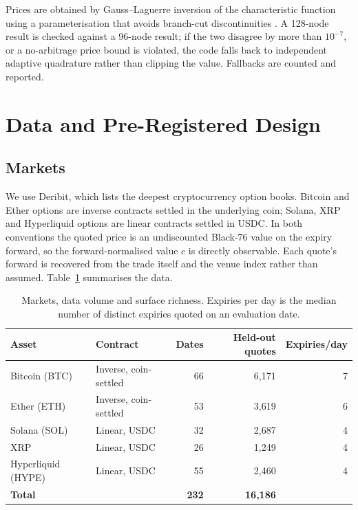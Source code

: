 \documentclass[runningheads]{llncs}
\begin{document}
Prices are obtained by Gauss--Laguerre inversion of the characteristic function
using a parameterisation that avoids branch-cut discontinuities
\cite{lord2010}. A 128-node result is checked against a 96-node result; if the
two disagree by more than $10^{-7}$, or a no-arbitrage price bound is violated,
the code falls back to independent adaptive quadrature rather than clipping the
value. Fallbacks are counted and reported.

\section{Data and Pre-Registered Design}

\subsection{Markets}

We use Deribit, which lists the deepest cryptocurrency option books. Bitcoin
and Ether options are inverse contracts settled in the underlying coin; Solana,
XRP and Hyperliquid options are linear contracts settled in USDC. In both
conventions the quoted price is an undiscounted Black-76 value on the expiry
forward, so the forward-normalised value $c$ is directly observable. Each
quote's forward is recovered from the trade itself and the venue index rather
than assumed. Table~\ref{tab:markets} summarises the data.

\begin{table}[htbp]
\centering
\caption{Markets, data volume and surface richness. Expiries per day is the
median number of distinct expiries quoted on an evaluation date.}
\label{tab:markets}
\begin{tabular}{llrrr}
\toprule
Asset & Contract & Dates & Held-out quotes & Expiries/day \\
\midrule
Bitcoin (BTC)      & Inverse, coin-settled & 66 & 6{,}171 & 7 \\
Ether (ETH)        & Inverse, coin-settled & 53 & 3{,}619 & 6 \\
Solana (SOL)       & Linear, USDC          & 32 & 2{,}687 & 4 \\
XRP                & Linear, USDC          & 26 & 1{,}249 & 4 \\
Hyperliquid (HYPE) & Linear, USDC          & 55 & 2{,}460 & 4 \\
\midrule
\textbf{Total}     &                       & \textbf{232} & \textbf{16{,}186} & \\
\bottomrule
\end{tabular}
\end{table}
\end{document}
